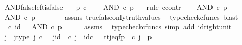 \begin{isabellebody}
%
\isadelimproof
\isanewline
%
\endisadelimproof
\isanewline
{}\isamarkupfalse%
\ AND{\isacharunderscore}{\kern0pt}false{\isacharunderscore}{\kern0pt}left{\isacharunderscore}{\kern0pt}is{\isacharunderscore}{\kern0pt}false{\isacharcolon}{\kern0pt}\isanewline
\ \ \ {\isachardoublequoteopen}p\ {\isasymin}\isactrlsub c\ {\isasymOmega}{\isachardoublequoteclose}\isanewline
\ \ \ {\isachardoublequoteopen}AND\ {\isasymcirc}\isactrlsub c\ {\isasymlangle}{\isasymf}{\isacharcomma}{\kern0pt}p{\isasymrangle}\ {\isacharequal}{\kern0pt}\ {\isasymf}{\isachardoublequoteclose}\isanewline
%
\isadelimproof
%
\endisadelimproof
%
\isatagproof
{}\isamarkupfalse%
\ {\isacharparenleft}{\kern0pt}rule\ ccontr{\isacharparenright}{\kern0pt}\isanewline
\ \ \isamarkupfalse%
\ {\isachardoublequoteopen}AND\ {\isasymcirc}\isactrlsub c\ {\isasymlangle}{\isasymf}{\isacharcomma}{\kern0pt}p{\isasymrangle}\ {\isasymnoteq}\ {\isasymf}{\isachardoublequoteclose}\isanewline
\ \ \isamarkupfalse%
\ \isamarkupfalse%
\ {\isachardoublequoteopen}AND\ {\isasymcirc}\isactrlsub c\ {\isasymlangle}{\isasymf}{\isacharcomma}{\kern0pt}p{\isasymrangle}\ {\isacharequal}{\kern0pt}\ {\isasymt}{\isachardoublequoteclose}\isanewline
\ \ \ \ \isamarkupfalse%
\ assms\ true{\isacharunderscore}{\kern0pt}false{\isacharunderscore}{\kern0pt}only{\isacharunderscore}{\kern0pt}truth{\isacharunderscore}{\kern0pt}values\ \isamarkupfalse%
\ {\isacharparenleft}{\kern0pt}typecheck{\isacharunderscore}{\kern0pt}cfuncs{\isacharcomma}{\kern0pt}\ blast{\isacharparenright}{\kern0pt}\isanewline
\ \ \isamarkupfalse%
\ \isamarkupfalse%
\ {\isachardoublequoteopen}{\isasymt}\ {\isasymcirc}\isactrlsub c\ id\ {\isasymone}\ {\isacharequal}{\kern0pt}\ AND\ {\isasymcirc}\isactrlsub c\ {\isasymlangle}{\isasymf}{\isacharcomma}{\kern0pt}p{\isasymrangle}{\isachardoublequoteclose}\isanewline
\ \ \ \ \isamarkupfalse%
\ assms\ \isamarkupfalse%
\ {\isacharparenleft}{\kern0pt}typecheck{\isacharunderscore}{\kern0pt}cfuncs{\isacharcomma}{\kern0pt}\ simp\ add{\isacharcolon}{\kern0pt}\ id{\isacharunderscore}{\kern0pt}right{\isacharunderscore}{\kern0pt}unit{}{\isacharparenright}{\kern0pt}\isanewline
\ \ \isamarkupfalse%
\ \isamarkupfalse%
\ j\ \ j{\isacharunderscore}{\kern0pt}type{\isacharcolon}{\kern0pt}\ {\isachardoublequoteopen}j\ {\isasymin}\isactrlsub c\ {\isasymone}{\isachardoublequoteclose}\ \ j{\isacharunderscore}{\kern0pt}id{\isacharcolon}{\kern0pt}\ {\isachardoublequoteopen}{\isasymbeta}\isactrlbsub {\isasymone}\isactrlesub \ {\isasymcirc}\isactrlsub c\ j\ {\isacharequal}{\kern0pt}\ id\isactrlsub c\ {\isasymone}{\isachardoublequoteclose}\ \ tt{\isacharunderscore}{\kern0pt}j{\isacharunderscore}{\kern0pt}eq{\isacharunderscore}{\kern0pt}fp{\isacharcolon}{\kern0pt}\ {\isachardoublequoteopen}{\isasymlangle}{\isasymt}{\isacharcomma}{\kern0pt}{\isasymt}{\isasymrangle}\ {\isasymcirc}\isactrlsub c\ j\ {\isacharequal}{\kern0pt}\ {\isasymlangle}{\isasymf}{\isacharcomma}{\kern0pt}p{\isasymrangle}{\isachardoublequoteclose}\isanewline

\end{isabellebody}
